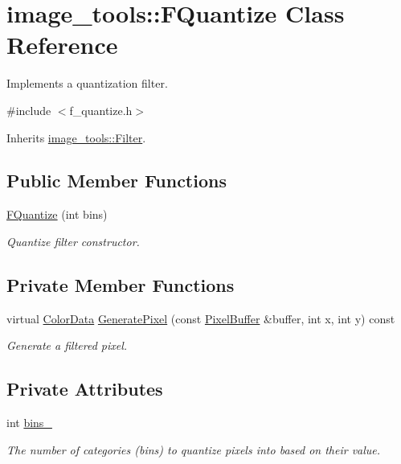 \hypertarget{classimage__tools_1_1FQuantize}{}\section{image\+\_\+tools\+:\+:F\+Quantize Class Reference}
\label{classimage__tools_1_1FQuantize}


Implements a quantization filter.  




{\ttfamily \#include $<$f\+\_\+quantize.\+h$>$}



Inherits \hyperlink{classimage__tools_1_1Filter}{image\+\_\+tools\+::\+Filter}.

\subsection*{Public Member Functions}
\begin{DoxyCompactItemize}
\item 
\hyperlink{classimage__tools_1_1FQuantize_a449e80031ef13d39fc29c8d2a450a4bb}{F\+Quantize} (int bins)
\begin{DoxyCompactList}\small\item\em Quantize filter constructor. \end{DoxyCompactList}\end{DoxyCompactItemize}
\subsection*{Private Member Functions}
\begin{DoxyCompactItemize}
\item 
virtual \hyperlink{classimage__tools_1_1ColorData}{Color\+Data} \hyperlink{classimage__tools_1_1FQuantize_a85066b63bff848dd4320501a3b79c7d6}{Generate\+Pixel} (const \hyperlink{classimage__tools_1_1PixelBuffer}{Pixel\+Buffer} \&buffer, int x, int y) const 
\begin{DoxyCompactList}\small\item\em Generate a filtered pixel. \end{DoxyCompactList}\end{DoxyCompactItemize}
\subsection*{Private Attributes}
\begin{DoxyCompactItemize}
\item 
int \hyperlink{classimage__tools_1_1FQuantize_a5378d59c5c3d85066a69eb05f138a56d}{bins\+\_\+}\hypertarget{classimage__tools_1_1FQuantize_a5378d59c5c3d85066a69eb05f138a56d}{}\label{classimage__tools_1_1FQuantize_a5378d59c5c3d85066a69eb05f138a56d}

\begin{DoxyCompactList}\small\item\em The number of categories (bins) to quantize pixels into based on their value. \end{DoxyCompactList}\end{DoxyCompactItemize}


